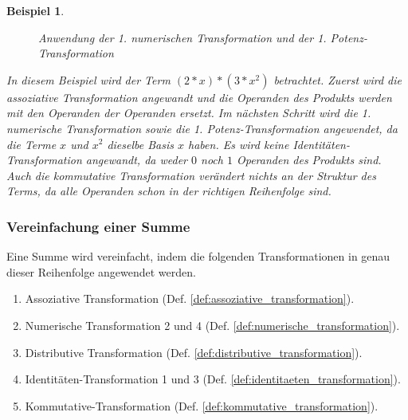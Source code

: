 \documentclass[11pt]{article}
\newcommand{\lab}[1]{(Def. \ref{#1})}
\newtheorem{example}{Beispiel}
\begin{document}
\begin{example}
\begin{figure}[h]
    \caption{Anwendung der 1. numerischen Transformation und der 1. Potenz-Transformation}
  \end{figure}
  In diesem Beispiel wird der Term $(2*x)*(3*x^2)$ betrachtet. Zuerst wird die assoziative Transformation angewandt und
  die Operanden des Produkts werden mit den Operanden der Operanden ersetzt. Im nächsten Schritt wird die 1. numerische 
  Transformation sowie die 1. Potenz-Transformation angewendet, da die Terme $x$ und $x^2$ dieselbe Basis $x$ haben.
  Es wird keine Identitäten-Transformation angewandt, da weder $0$ noch $1$ Operanden des Produkts sind.
  Auch die kommutative Transformation verändert nichts an der Struktur des Terms, da alle Operanden schon in der richtigen
  Reihenfolge sind.
\end{example}

\subsubsection{Vereinfachung einer Summe}
Eine Summe wird vereinfacht, indem die folgenden 
Transformationen in genau dieser Reihenfolge angewendet werden.
\begin{enumerate}
  \item Assoziative Transformation \lab{def:assoziative_transformation}.
  \item Numerische Transformation 2 und 4 \lab{def:numerische_transformation}.
  \item Distributive Transformation \lab{def:distributive_transformation}.
  \item Identitäten-Transformation 1 und 3 \lab{def:identitaeten_transformation}.
  \item Kommutative-Transformation \lab{def:kommutative_transformation}.
\end{enumerate}
\end{document}
